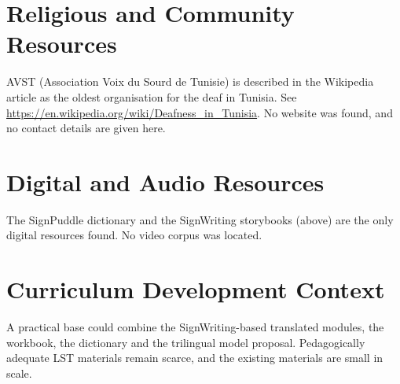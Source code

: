 \documentclass[12pt]{article}
\begin{document}
\section{Religious and Community Resources}
AVST (Association Voix du Sourd de Tunisie) is described in the Wikipedia article as the oldest organisation for the deaf in Tunisia. See \url{https://en.wikipedia.org/wiki/Deafness_in_Tunisia}. No website was found, and no contact details are given here.

\section{Digital and Audio Resources}
The SignPuddle dictionary and the SignWriting storybooks (above) are the only digital resources found. No video corpus was located.

\section{Curriculum Development Context}
A practical base could combine the SignWriting-based translated modules, the workbook, the dictionary and the trilingual model proposal. Pedagogically adequate LST materials remain scarce, and the existing materials are small in scale.
\end{document}
